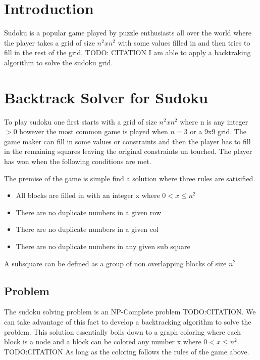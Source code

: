 \documentclass{sig-alternate}
\begin{document}



\section{Introduction}
Sudoku is a popular game played by puzzle enthusiasts all over the world where the player takes 
a grid of size $n^2 x n^2$ with some values filled in and then tries to fill in the rest of the grid. TODO: CITATION
I am able to apply a backtraking algorithm to solve the sudoku grid. 

\section{Backtrack Solver for Sudoku}

To play sudoku one first starts with a grid of size $n^2 x n^2$ where n is any integer $> 0$ however the most common game is 
played when $n = 3$ or a 9x9 grid. The game maker can fill in some values or constraints and then the player has to fill in
the remaining squares leaving the original constraints un touched. The player has won when the following conditions are met.

The premise of the game is simple find a solution where three rules are satisified.
\begin{itemize}
\item{All blocks are filled in with an integer x where $0 < x \le n^2$}
\item{There are no duplicate numbers in a given row}
\item{There are no duplicate numbers in a given col}
\item{There are no duplicate numbers in any given sub square}
\end{itemize}
A subsquare can be defined as a group of non overlapping blocks of size $n^2$

\subsection{Problem}
The sudoku solving problem is an NP-Complete problem TODO:CITATION. We can take
advantage of this fact to develop a backtracking algorithm to solve the problem. This solution
essentially boils down to a graph coloring where each block is a node and a block can be colored any number x where $0 < x \le n^2$. TODO:CITATION
As long as the coloring follows the rules of the game above. 
\end{document}
